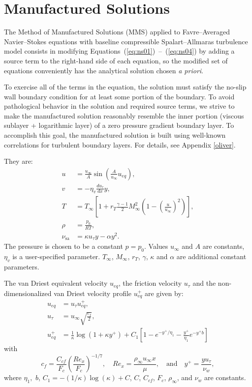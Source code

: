 \documentclass[10pt]{article}
\newcommand{\dd}[2]{\frac{d #1}{d #2}}
\newcommand{\sa}{\nu_{\mathrm{sa}}}
\begin{document}


\section{Manufactured Solutions}

The Method of Manufactured Solutions (MMS) applied to Favre--Averaged Navier--Stokes equations with baseline compressible Spalart--Allmaras turbulence model consists in modifying Equations~(\ref{eq:ns01})~--~(\ref{eq:ns04}) by adding a source term to the right-hand side of each equation, so the modified set of equations conveniently has the analytical solution chosen \textit{a priori}.

To exercise all of the terms in the equation, the
solution must satisfy the no-slip wall boundary condition for at least
some portion of the boundary.  To avoid pathological behavior in the
solution and required source terms, we strive to make the manufactured
solution reasonably resemble the inner portion (viscous sublayer +
logarithmic layer) of a zero pressure gradient boundary layer.  To
accomplish this goal, the manufactured solution is built using
well-known correlations for turbulent boundary layers. For details, see Appendix \ref{oliver}.

They are:
\begin{equation}
\begin{split}\label{eq:manufactured_2d}
u &= \frac{u_{\infty}}{A} \sin \left( \frac{A}{u_{\infty}} u_{eq} \right),\\
v &= -\eta_v \dd{u_{\tau}}{x} y,\\
T &= T_{\infty} \left[ 1 + r_T \frac{\gamma - 1}{2} M_{\infty}^2 \left( 1 - \left(\frac{u}{u_{\infty}}\right)^2 \right) \right],\\
\rho &= \frac{p_0}{R T},\\
\sa &= \kappa u_{\tau} y - \alpha y^2.
\end{split}
\end{equation}
The pressure is chosen to be a constant $p = p_0$. Values $u_{\infty}$ and $A$ are constants, $\eta_v$ is a user-specified parameter. $T_{\infty}$, $M_{\infty}$, $r_T$, $\gamma$, $\kappa$ and $\alpha$ are additional constant parameters.

The van Driest equivalent velocity $u_{eq}$, the friction velocity $u_{\tau}$ and the non-dimensionalized van Driest velocity profile $u_{eq}^+$ are given by:
\begin{equation}
\begin{split}
u_{eq} &= u_{\tau} u_{eq}^+,\\
u_{\tau}  &= u_{\infty} \sqrt{\frac{c_f}{2}}, \\
u_{eq}^+ &= \frac{1}{\kappa} \log \left( 1 + \kappa y^+ \right) + C_1 \left[ 1 - e^{-y^+/\eta_1} - \frac{y^+}{\eta_1} e^{-y^+ b} \right]
\end{split}
\end{equation}
with 
$$c_f = \dfrac{C_{cf}}{F_c} \left( \dfrac{Re_x}{F_c}  \right)^{-1/7}, \quad Re_x= \dfrac{\rho_{\infty} u_{\infty} x}{\mu}, \quad\text{and}\quad y^{+}= \dfrac{y u_\tau}{\nu_w},$$ 
where $\eta_1,$ $b$, $C_1 = -(1/\kappa) \log(\kappa) + C$, $C$, $C_{cf}$, $F_c$, $\rho_{\infty}$, and $\nu_w$ are constants.
\end{document}
